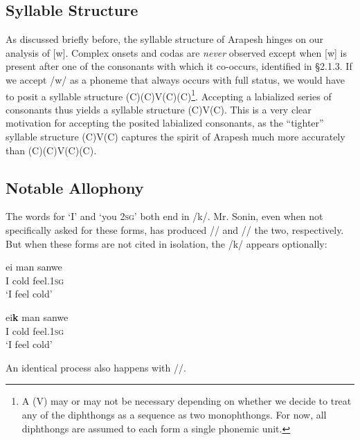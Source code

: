 \documentclass[pdftex,12pt,letterpaper]{article}
\let\ipa\textipa
\begin{document}
 \subsection{Syllable Structure}

 As discussed briefly before, the syllable structure of Arapesh hinges on our analysis of [w]. Complex onsets and codas are \emph{never} observed except when [w] is present after one of the consonants with which it co-occurs, identified in \S 2.1.3. If we accept /w/ as a phoneme that always occurs with full status,  we would have to posit a syllable structure (C)(C)V(C)(C)\footnote{A (V) may or may not be necessary depending on whether we decide to treat any of the diphthongs as a sequence as two monophthongs. For now, all diphthongs are assumed to each form a single phonemic unit.}. Accepting a labialized series of consonants thus yields a syllable structure (C)V(C). This is a very clear motivation for accepting the posited labialized consonants, as the ``tighter'' syllable structure (C)V(C) captures the spirit of Arapesh much more accurately than (C)(C)V(C)(C).

 \subsection{Notable Allophony}

 The words for `I' and `you \textsc{2sg}' both end in /k/. Mr. Sonin, even when not specifically asked for these forms, has produced /\ipa{eik}/ and /\ipa{\textltailn@k}/ the two, respectively. But when these forms are not cited in isolation, the /k/ appears optionally:

 \begin{minipage}{\textwidth}
 \begin{exe}
 \ex
 \gll ei man\ipa{@g@s} sanwe \\
 I cold feel.\textsc{1sg} \\
 \trans `I feel cold'

 \ex
 \gll ei\textbf{k} man\ipa{@g@s} sanwe \\
 I cold feel.\textsc{1sg} \\
 \trans `I feel cold'
 \end{exe}
 \vspace{10pt}
 \end{minipage}

 \noindent An identical process also happens with /\ipa{\textltailn@k}/.
\end{document}
